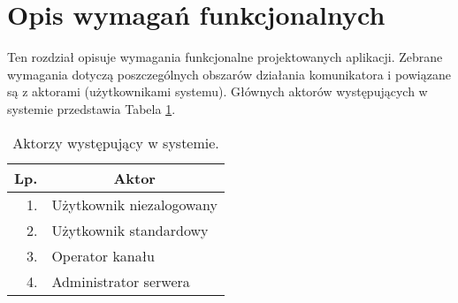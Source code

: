 \section{Opis wymagań funkcjonalnych}
Ten rozdział opisuje wymagania funkcjonalne projektowanych aplikacji. Zebrane wymagania dotyczą poszczególnych obszarów działania komunikatora i powiązane są z aktorami (użytkownikami systemu). Głównych aktorów występujących w systemie przedstawia Tabela \ref{tab:aktorzy}.

\begin{table}[!hbp]
	\centering
	\caption{Aktorzy występujący w systemie.}
	\label{tab:aktorzy}
	\begin{tabular}{|r|l|} \hline
		\multicolumn{1}{|c|}{\textbf{Lp.}} & \multicolumn{1}{|c|}{\textbf{Aktor}} \\ \hline
		1. & Użytkownik niezalogowany \\ \hline
		2. & Użytkownik standardowy \\ \hline
		3. & Operator kanału \\ \hline
		4. & Administrator serwera \\ \hline
	\end{tabular}
\end{table}

